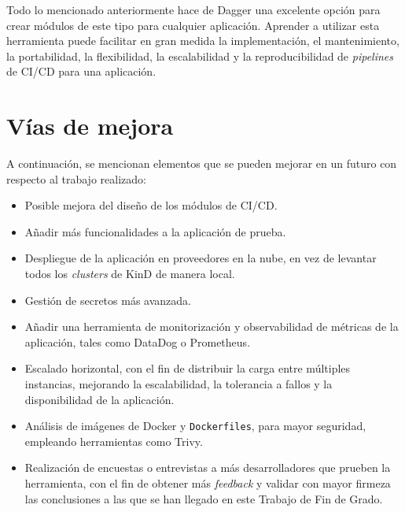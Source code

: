 Todo lo mencionado anteriormente hace de Dagger una excelente opción para crear módulos de este tipo para cualquier aplicación. Aprender a utilizar esta herramienta puede facilitar en gran medida la implementación, el mantenimiento, la portabilidad, la flexibilidad, la escalabilidad y la reproducibilidad de \textit{pipelines} de CI/CD para una aplicación.

\section{Vías de mejora}

A continuación, se mencionan elementos que se pueden mejorar en un futuro con respecto al trabajo realizado:

\begin{itemize}
  \item Posible mejora del diseño de los módulos de CI/CD.
  \item Añadir más funcionalidades a la aplicación de prueba.
  \item Despliegue de la aplicación en proveedores en la nube, en vez de levantar todos los \textit{clusters} de KinD de manera local.
  \item Gestión de secretos más avanzada.
  \item Añadir una herramienta de monitorización y observabilidad de métricas de la aplicación, tales como DataDog\cite{datadog} o Prometheus\cite{prometheus}.
  \item Escalado horizontal\cite{horizontal}, con el fin de distribuir la carga entre múltiples instancias, mejorando la escalabilidad, la tolerancia a fallos y la disponibilidad de la aplicación.
  \item Análisis de imágenes de Docker y \texttt{Dockerfiles}, para mayor seguridad, empleando herramientas como Trivy\cite{trivy}.
  \item Realización de encuestas o entrevistas a más desarrolladores que prueben la herramienta, con el fin de obtener más \textit{feedback} y validar con mayor firmeza las conclusiones a las que se han llegado en este Trabajo de Fin de Grado.
\end{itemize}
